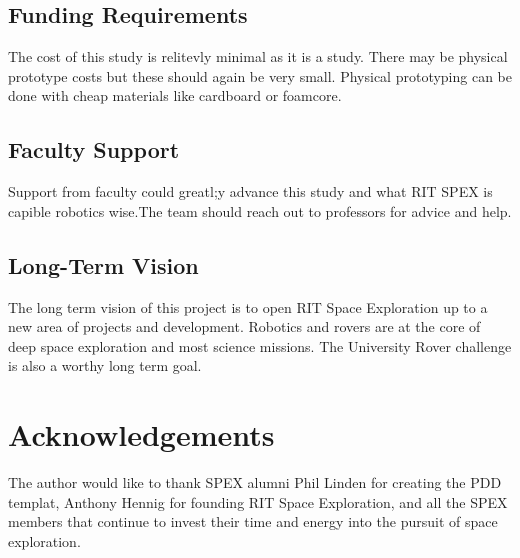 \documentclass[conference]{IEEEtran} %
\begin{document}
\subsection{Funding Requirements}

The cost of this study is relitevly minimal as it is a study. 
There may be physical prototype costs but these should again be very small. 
Physical prototyping can be done with cheap materials like cardboard or foamcore.  

\subsection{Faculty Support}
Support from faculty could greatl;y advance this study and what RIT SPEX is capible robotics wise.The team should reach out to professors for advice and help.

\subsection{Long-Term Vision}
\label{sec:vision}
The long term vision of this project is to open RIT Space Exploration up to a new area of projects and development. Robotics and rovers are at the core of deep space exploration and most science missions. The University Rover challenge is also a worthy long term goal. 

\section*{Acknowledgements}
The author would like to thank SPEX alumni Phil Linden for creating the PDD templat, Anthony Hennig for founding RIT Space Exploration, and all the SPEX members that continue to invest their time and energy into the pursuit of space exploration.




\onecolumn
\appendices{}
\end{document}
